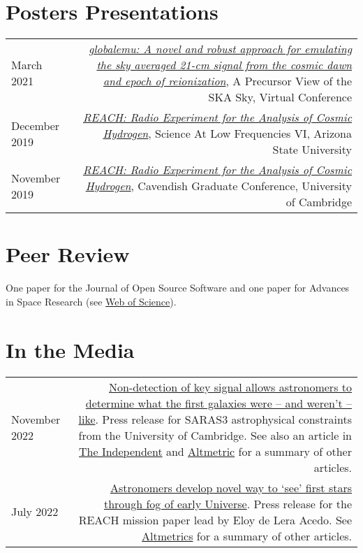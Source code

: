 \documentclass{article}
\begin{document}
\section*{Posters Presentations}

\begin{tabular}{L!{\vrule}R}
	March 2021 & \href{https://github.com/htjb/Talks/blob/master/Posters/SKA_globalemu_March_2021/globalemu.pdf}{\textit{globalemu: A novel and robust approach for emulating the sky averaged 21-cm signal from the cosmic dawn and epoch of reionization}}, A Precursor View of the SKA Sky, Virtual Conference\\
	December 2019 & \href{https://drive.google.com/file/d/1dvgumyu4cXxXqoYxikU3DKOa4u_gpGzn/view}{\textit{REACH: Radio Experiment for the Analysis of Cosmic Hydrogen}}, Science At Low Frequencies VI, Arizona State University \\
	November 2019 & \href{https://github.com/htjb/Talks/blob/master/Posters/Cav_Graduate_Conf_REACH_Nov_2019/REACH_poster.pdf}{\textit{REACH: Radio Experiment for the Analysis of Cosmic Hydrogen}}, Cavendish Graduate Conference, University of Cambridge
\end{tabular}

\section*{Peer Review}
One paper for the Journal of Open Source Software and one paper for Advances in Space Research (see \href{https://www.webofscience.com/wos/author/record/3920858}{Web of Science}).

\section*{In the Media}

\begin{tabular}{L!{\vrule}R}
	November 2022 & \href{https://www.cam.ac.uk/research/news/non-detection-of-key-signal-allows-astronomers-to-determine-what-the-first-galaxies-were-and-werent}{Non-detection of key signal allows astronomers to determine what the first galaxies were – and weren’t – like}. Press release for SARAS3 astrophysical constraints from the University of Cambridge. See also an article in \href{https://www.independent.co.uk/space/galaxies-beginning-cosmic-dawn-signal-b2234570.html?amp}{The Independent} and \href{https://nature.altmetric.com/details/139089769/news}{Altmetric} for a summary of other articles. \\
	July 2022 & \href{https://www.cam.ac.uk/research/news/astronomers-develop-novel-way-to-see-the-first-stars-through-the-fog-of-the-early-universe}{Astronomers develop novel way to ‘see’ first stars through fog of early Universe}. Press release for the REACH mission paper lead by Eloy de Lera Acedo. See \href{https://nature.altmetric.com/details/132932581/news}{Altmetrics} for a summary of other articles.
\end{tabular}
\end{document}
